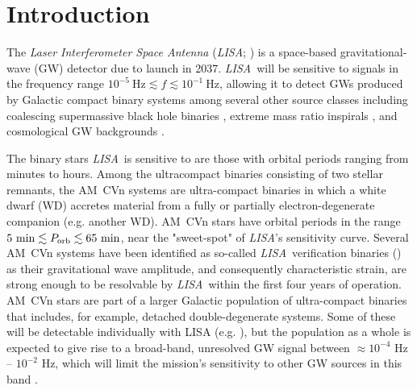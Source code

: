 \documentclass[fleqn,usenatbib]{mnras}
\newcommand{\lisa}{{\it LISA}}
\begin{document}
\section{Introduction}
\label{sec:intro}

The \textit{Laser Interferometer Space Antenna} (\lisa; \citealt{lisa17}) is a space-based gravitational-wave (GW) detector due to launch in 2037. \lisa\ will be sensitive to signals in the frequency range $10^{-5}~\mathrm{Hz} \lesssim f \lesssim 10^{-1}~\mathrm{Hz}$, allowing 
it to detect GWs produced by Galactic compact binary systems among several other source classes including coalescing supermassive black hole binaries \citep[e.g.][]{Klein2016, Bellovary2019}, extreme mass ratio inspirals \citep[e.g.][]{Berti2006, Barack2007}, and cosmological GW backgrounds \citep[][]{Caprini2016, Bartolo2016}.

The binary stars \lisa\ is sensitive to are those with orbital periods ranging from minutes to hours. Among the ultracompact binaries consisting of two stellar remnants, the AM~CVn systems are ultra-compact binaries in which a white dwarf (WD) accretes material from a fully or partially electron-degenerate companion (e.g. another WD). AM~CVn stars have orbital periods in the range $5~\mathrm{min} \lesssim P_{\rm{orb}} \lesssim 65~\mathrm{min}$, near the "sweet-spot" of \lisa's sensitivity curve. Several AM~CVn systems have been identified as so-called \lisa\ verification binaries (\citealt{kupfer18,kupfer23}) as their gravitational wave amplitude, and consequently characteristic strain, are strong enough to be resolvable by \lisa\ within the first four years of operation. AM~CVn stars are part of a larger Galactic population of ultra-compact binaries that includes, for example, detached double-degenerate systems. Some of these will be detectable individually with LISA (e.g. \citealt{burdge20}), but the population as a whole is expected to give rise to a broad-band, unresolved GW signal between $\approx 10^{-4}$ Hz -- $10^{-2}$ Hz, which will limit the mission's sensitivity to other GW sources in this band \citep{nelemans01, ruiter10, nissanke12, korol17, lamberts19, breivik20a, breivik2020b, korol22, thiele2023}.
\end{document}
